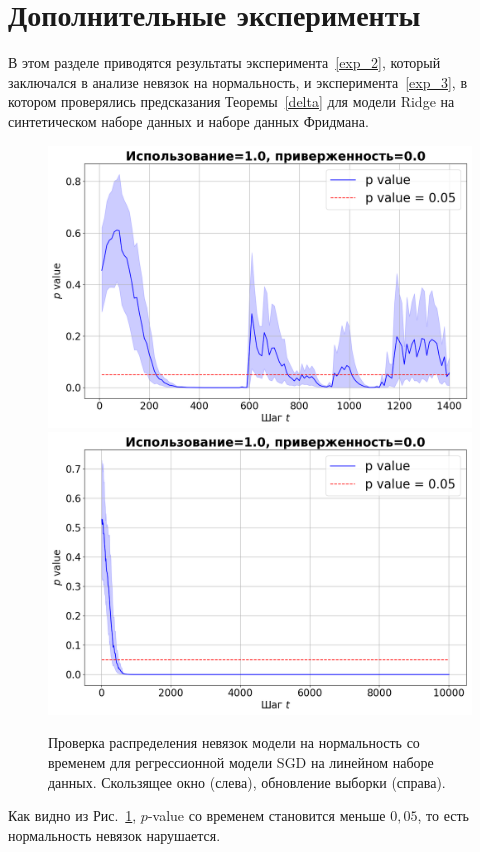 \section{Дополнительные эксперименты} \label{Appendix}

    В этом разделе приводятся результаты эксперимента~\ref{exp_2}, который заключался в анализе невязок на нормальность, и эксперимента~\ref{exp_3}, в котором проверялись предсказания Теоремы~\ref{delta} для модели Ridge на синтетическом наборе данных и наборе данных Фридмана.

    \begin{figure}[ht]
        \centering
        \includegraphics[width=0.49\linewidth]{pictures/p_sw_synthetic_sgd_model_50_1.0_0.0.png}
        \includegraphics[width=0.49\linewidth]{pictures/p_su_synthetic_sgd_model_50_1.0_0.0.png}
        
        \caption{Проверка распределения невязок модели на нормальность со временем для регрессионной модели SGD на линейном наборе данных. Скользящее окно (слева), обновление выборки (справа).}
        \label{p_value}
    \end{figure}

    Как видно из Рис.~\ref{p_value}, $p$-value со временем становится меньше $0,05$, то есть нормальность невязок нарушается.

